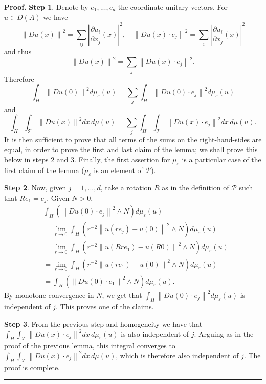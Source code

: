 \documentclass[11pt]{preprint}
\newenvironment{proof}[1][Proof]{\textbf{#1.} }{\ \rule{0.5em}{0.5em}}
\begin{document}
\begin{proof}
\textbf{Step 1}. Denote by $e_{1},...,e_{d}$ the coordinate unitary vectors.
For $u\in D(A)$ we have
\[
\left\|  Du\left(  x\right)  \right\|  ^{2}=\sum_{ij}\left|  \frac{\partial
u_{i}}{\partial x_{j}}\left(  x\right)  \right|  ^{2},\quad\left\|  Du\left(
x\right)  \cdot e_{j}\right\|  ^{2}=\sum_{i}\left|  \frac{\partial u_{i}%
}{\partial x_{j}}\left(  x\right)  \right|  ^{2}%
\]
and thus
\[
\left\|  Du\left(  x\right)  \right\|  ^{2}=\sum_{j}\left\|  Du\left(
x\right)  \cdot e_{j}\right\|  ^{2}.
\]
Therefore
\[
\int_{H}\left\|  Du\left(  0\right)  \right\|  ^{2}d\mu_{\varepsilon}\left(
u\right)  =\sum_{j}\int_{H}\left\|  Du\left(  0\right)  \cdot e_{j}\right\|
^{2}d\mu_{\varepsilon}\left(  u\right)
\]
and
\[
\int_{H}\int_{\mathcal{T}}\left\|  Du\left(  x\right)  \right\|  ^{2}%
dx\,d\mu\left(  u\right)  =\sum_{j}\int_{H}\int_{\mathcal{T}}\left\|  Du\left(
x\right)  \cdot e_{j}\right\|  ^{2}dx\,d\mu\left(  u\right)  .
\]
It is then sufficient to prove that all terms of the sums on the
right-hand-sides are equal, in order to prove the first and last claim of the
lemma; we shall prove this below in steps 2 and 3. Finally, the first
assertion for $\mu_{\varepsilon}$ is a particular case of the first claim of
the lemma ($\mu_{\varepsilon}$ is an element of $\mathcal{P}$).

\textbf{Step 2}. Now, given $j=1,...,d$, take a rotation $R$ as in the
definition of $\mathcal{P}$ such that $Re_{1}=e_{j}$. Given $N>0$,
\begin{align*}
&  \int_{H}\left(  \left\|  Du\left(  0\right)  \cdot e_{j}\right\|
^{2}\wedge N\right)  d\mu_{\varepsilon}\left(  u\right) \\
&  =\lim_{r\rightarrow0}\int_{H}\left(  r^{-2}\left\|  u\left(  re_{j}\right)
-u\left(  0\right)  \right\|  ^{2}\wedge N\right)  d\mu_{\varepsilon}\left(
u\right) \\
&  =\lim_{r\rightarrow0}\int_{H}\left(  r^{-2}\left\|  u\left(  Rre_{1}%
\right)  -u\left(  R0\right)  \right\|  ^{2}\wedge N\right)  d\mu
_{\varepsilon}\left(  u\right) \\
&  =\lim_{r\rightarrow0}\int_{H}\left(  r^{-2}\left\|  u\left(  re_{1}\right)
-u\left(  0\right)  \right\|  ^{2}\wedge N\right)  d\mu_{\varepsilon}\left(
u\right) \\
&  =\int_{H}\left(  \left\|  Du\left(  0\right)  \cdot e_{1}\right\|
^{2}\wedge N\right)  d\mu_{\varepsilon}\left(  u\right)  .
\end{align*}
By monotone convergence in $N$, we get that $\int_{H}\left\|  Du\left(
0\right)  \cdot e_{j}\right\|  ^{2}d\mu_{\varepsilon}\left(  u\right)  $ is
independent of $j$. This proves one of the claims.

\textbf{Step 3}. From the previous step and homogeneity we have that $\int
_{H}\int_{\mathcal{T}}\left\|  Du\left(  x\right)  \cdot e_{j}\right\|
^{2}dx\,d\mu_{\varepsilon}\left(  u\right)  $ is also independent of $j$.
Arguing as in the proof of the previous lemma, this integral converges to
$\int_{H}\int_{\mathcal{T}}\left\|  Du\left(  x\right)  \cdot e_{j}\right\|
^{2}dx\,d\mu\left(  u\right)  $, which is therefore also independent of $j$. The
proof is complete.
\end{proof}
\end{document}
